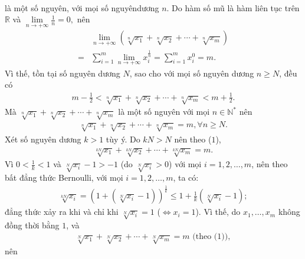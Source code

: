 \begin{multicols}{2}
\begin{align*}
	\end{align*}
	là một số nguyên, với mọi số nguyên\linebreak dương $n$.
	\vskip 0.05cm
	Do hàm số mũ là hàm liên tục trên $\mathbb{R}$ và  $\mathop {\lim }\limits_{n \to  + \infty } \frac{1}{n} = 0,$ nên
	\begin{align*}
		&\mathop {\lim }\limits_{n \to  + \infty } \left( {\sqrt[n]{{{x_1}}} + \sqrt[n]{{{x_2}}} +  \cdots  + \sqrt[n]{{{x_m}}}} \right) \\
		= &\sum\limits_{i = 1}^m {\mathop {\lim }\limits_{n \to  + \infty } x_i^{\frac{1}{n}}}  = \sum\limits_{i = 1}^m {x_i^0}  = m.
	\end{align*}
	Vì thế, tồn tại số nguyên dương $N$, sao cho với mọi số nguyên dương $n \ge N$, đều có
	\begin{align*}
		m - \frac{1}{2} < \sqrt[n]{{{x_1}}} + \sqrt[n]{{{x_2}}} +  \cdots  + \sqrt[n]{{{x_m}}} < m + \frac{1}{2}.
	\end{align*}
	Mà  $\sqrt[n]{{{x_1}}} + \sqrt[n]{{{x_2}}} +  \cdots  + \sqrt[n]{{{x_m}}}$ là một số nguyên với mọi $n \in \mathbb{N^*}$  nên
	\begin{align*}
		\sqrt[n]{{{x_1}}} \!+\! \sqrt[n]{{{x_2}}} \!+\!  \cdots  \!+\! \sqrt[n]{{{x_m}}} \!=\! m,\forall n \!\ge\! N. \tag{$1$}
	\end{align*}
	Xét số nguyên dương $k > 1$ tùy ý.
	\vskip 0.05cm
	Do $kN > N$ nên theo ($1$),
	\begin{align*}
		\sqrt[{kN}]{{{x_1}}} + \sqrt[{kN}]{{{x_2}}} +  \cdots  + \sqrt[{kN}]{{{x_m}}} = m. \tag{$2$}
	\end{align*}
	Vì $0 < \frac{1}{k} < 1$  và $\sqrt[N]{{{x_i}}} - 1 >  - 1$  (do  $\sqrt[N]{{{x_i}}} > 0$) với mọi $i = 1, 2, \ldots, m$, nên theo bất đẳng thức Bernoulli, với mọi $i = 1, 2, \ldots, m$, ta có:
	\begin{align*}
		\sqrt[{kN}]{{{x_i}}} \!=\! {\left( {1 \!+\! \left( {\sqrt[N]{{{x_i}}} \!-\! 1} \right)}\right)^{\frac{1}{k}}} \!\le\! 1 \!+\! \frac{1}{k}\left(\! {\sqrt[N]{{{x_i}}} \!-\! 1} \!\right);
	\end{align*}
	đẳng thức xảy ra khi và chỉ khi $\sqrt[N]{{{x_i}}} = 1$ \linebreak($\Leftrightarrow x_i = 1$).
	\vskip 0.05cm
	Vì thế, do  $x_1, \ldots,x_m$   không đồng thời bằng $1$, và
	\begin{align*}
		\sqrt[N]{{{x_1}}} + \sqrt[N]{{{x_2}}} +  \cdots  + \sqrt[N]{{{x_m}}} = m \text{ (theo ($1$))},
	\end{align*}
	nên
	\begin{align*}

\end{align*}
\end{multicols}

